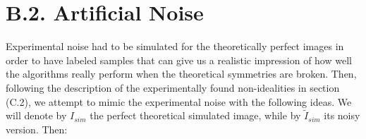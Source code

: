 \documentclass[11pt, a4paper, twoside]{article} %
\begin{document}
\section*{B.2. Artificial Noise \vspace{-0.3cm}
}
Experimental noise had to be simulated for the theoretically perfect images in order to have labeled samples that can  give us a realistic impression of how well the algorithms really perform when the theoretical symmetries are broken. Then, following the description of the experimentally found non-idealities in section (C.2), we attempt to mimic the experimental noise with the following ideas. We will denote by $I_{sim}$ the perfect theoretical simulated image, while by $\tilde{I}_{sim}$ its noisy version. Then:
\end{document}

